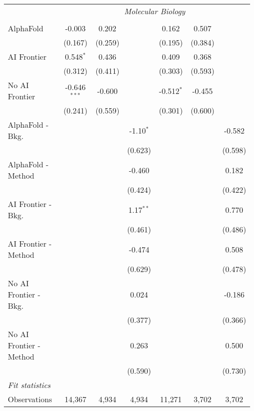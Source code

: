 \begin{tabular}{lcccccc}
 & \multicolumn{6}{c}{\textit{Molecular Biology}} \\ \\
   AlphaFold               & -0.003         & 0.202   &             & 0.162        & 0.507   &   \\   
                           & (0.167)        & (0.259) &             & (0.195)      & (0.384) &   \\   
   AI Frontier             & 0.548$^{*}$    & 0.436   &             & 0.409        & 0.368   &   \\   
                           & (0.312)        & (0.411) &             & (0.303)      & (0.593) &   \\   
   No AI Frontier          & -0.646$^{***}$ & -0.600  &             & -0.512$^{*}$ & -0.455  &   \\   
                           & (0.241)        & (0.559) &             & (0.301)      & (0.600) &   \\   
   AlphaFold - Bkg.        &                &         & -1.10$^{*}$ &              &         & -0.582\\   
                           &                &         & (0.623)     &              &         & (0.598)\\   
   AlphaFold - Method      &                &         & -0.460      &              &         & 0.182\\   
                           &                &         & (0.424)     &              &         & (0.422)\\   
   AI Frontier - Bkg.      &                &         & 1.17$^{**}$ &              &         & 0.770\\   
                           &                &         & (0.461)     &              &         & (0.486)\\   
   AI Frontier - Method    &                &         & -0.474      &              &         & 0.508\\   
                           &                &         & (0.629)     &              &         & (0.478)\\   
   No AI Frontier - Bkg.   &                &         & 0.024       &              &         & -0.186\\   
                           &                &         & (0.377)     &              &         & (0.366)\\   
   No AI Frontier - Method &                &         & 0.263       &              &         & 0.500\\   
                           &                &         & (0.590)     &              &         & (0.730)\\   
   \midrule
   \emph{Fit statistics}\\
   Observations            & 14,367         & 4,934   & 4,934       & 11,271       & 3,702   & 3,702\\  
   

\end{tabular}
